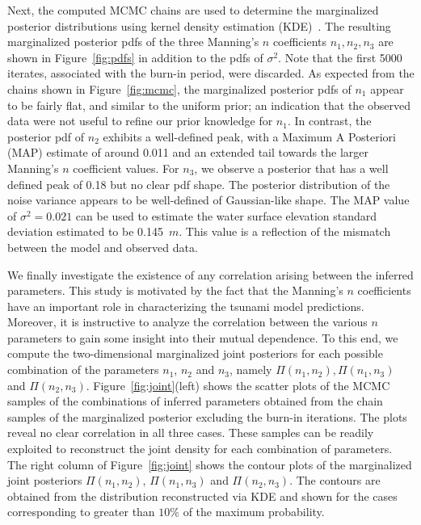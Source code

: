 Next, the computed MCMC chains are used to determine the marginalized posterior 
distributions using kernel density estimation (KDE)~\citep{Parzen1962,Silverman1986}.  
The resulting marginalized posterior pdfs of the three Manning's $n$ coefficients 
$n_1,n_2,n_3$ are shown in Figure~\ref{fig:pdfs} in addition to the pdfs of $\sigma^2$. 
Note that the first 5000 iterates, associated with the burn-in period, were discarded.  
As expected from the chains shown in Figure~\ref{fig:mcmc}, the marginalized posterior 
pdfs of $n_1$ appear to be fairly flat, and similar to the uniform prior; an indication 
that the observed data were not useful to refine our prior knowledge for $n_1$. In 
contrast, the posterior pdf of $n_2$ exhibits a well-defined peak, with a Maximum A 
Posteriori (MAP) estimate of around 0.011 and an extended tail towards the larger 
Manning's $n$ coefficient values. For $n_3$, we observe a posterior that has a well 
defined peak of 0.18 but no clear pdf shape. The posterior distribution of the noise variance 
appears to be well-defined of Gaussian-like shape. The MAP value of $\sigma^2=0.021$ 
can be used to estimate the water surface elevation standard deviation estimated to 
be 0.145~$m$. This value is a reflection of the mismatch between the model and 
observed data.

We finally investigate the existence of any correlation arising between the inferred parameters.
This study is motivated by the fact that the Manning's $n$ coefficients have an important role 
in characterizing the tsunami model predictions. Moreover, it is instructive to analyze the 
correlation between the various $n$ parameters to gain some insight into their mutual dependence.
To this end, we compute the two-dimensional marginalized joint posteriors for each 
possible combination of the parameters $n_1$, $n_2$ and $n_3$, namely $\Pi(n_1, n_2), \Pi(n_1, n_3)$ and $\Pi(n_2, n_3)$. 
Figure~\ref{fig:joint}(left) shows the scatter plots of the MCMC samples of the combinations of 
inferred parameters obtained from the chain samples of the marginalized posterior excluding 
the burn-in iterations. The plots reveal no clear correlation in all three cases. 
These samples can be readily exploited to reconstruct the joint density for each combination of parameters. 
The right column of Figure~\ref{fig:joint} shows the contour plots of the marginalized joint posteriors 
$\Pi(n_1, n_2)$, $\Pi(n_1, n_3)$ and $\Pi(n_2, n_3)$. The contours are obtained from the
distribution reconstructed via KDE and shown for the cases corresponding to greater than $10\%$
of the maximum probability.

